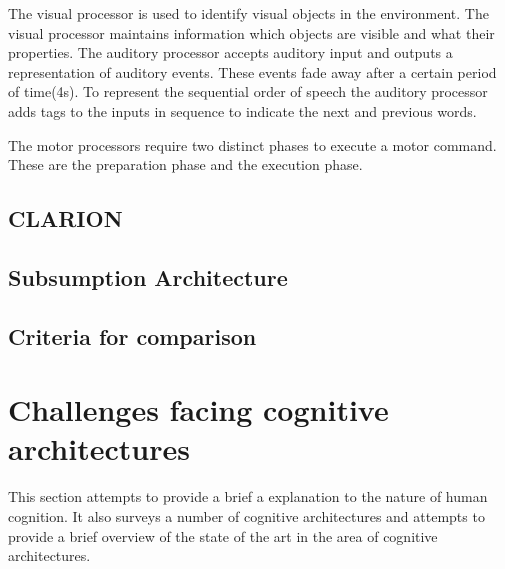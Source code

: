 The visual processor is used to identify visual objects in the
environment. The visual processor maintains information which objects
are visible and what their properties. The auditory processor accepts
auditory input and outputs a representation of auditory events. These
events fade away after a certain period of time(4s). To represent the
sequential order of speech the auditory processor adds tags to the
inputs in sequence to indicate the next and previous words.

The motor processors require two distinct phases to execute a motor
command. These are the preparation phase and the execution phase. 


\subsection{CLARION}
\subsection{Subsumption Architecture}

\subsection{Criteria for comparison}






\section{Challenges facing cognitive architectures}

This section attempts to provide a brief a explanation to the nature
of human cognition. It also surveys a number of cognitive
architectures and attempts to provide a brief overview of the state of
the art in the area of cognitive architectures. 


